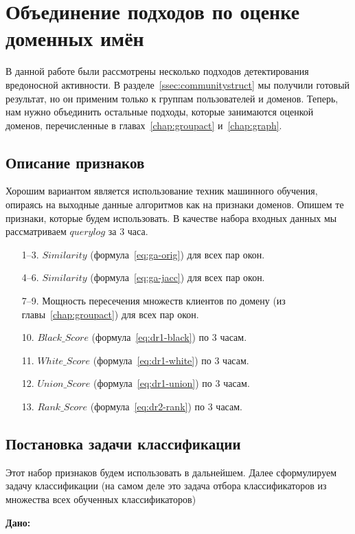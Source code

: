 \documentclass[a4paper,14pt]{extreport} %
\begin{document}
\chapter{Объединение подходов по оценке доменных имён}
\label{chap:union-all}
В данной работе были рассмотрены несколько подходов детектирования вредоносной активности. В разделе~\ref{ssec:communitystruct} мы получили готовый результат, но он применим только к группам пользователей и доменов. Теперь, нам нужно объединить остальные подходы, которые занимаются оценкой доменов, перечисленные в главах~\ref{chap:groupact} и~\ref{chap:graph}.
	
\section{Описание признаков}
\label{sec:desc-features}
Хорошим вариантом является использование техник машинного обучения, опираясь на выходные данные алгоритмов как на признаки доменов. Опишем те признаки, которые будем использовать. В качестве набора входных данных мы рассматриваем $querylog$ за 3 часа.
\begin{enumerate}
	\item [1--3.] $Similarity$ (формула~\eqref{eq:ga-orig}) для всех пар окон.
	\item [4--6.]$Similarity$ (формула~\eqref{eq:ga-jacc}) для всех пар окон.
	\item [7--9.] Мощность пересечения множеств клиентов по домену (из главы~\ref{chap:groupact}) для всех пар окон.
	\item [10.] $Black\_Score$ (формула~\eqref{eq:dr1-black}) по 3 часам.
	\item [11.] $White\_Score$ (формула~\eqref{eq:dr1-white}) по 3 часам.
	\item [12.] $Union\_Score$ (формула~\eqref{eq:dr1-union}) по 3 часам.
	\item [13.] $Rank\_Score$ (формула~\eqref{eq:dr2-rank}) по 3 часам.
	      	      		
\end{enumerate}
\section{Постановка задачи классификации}
Этот набор признаков будем использовать в дальнейшем. Далее сформулируем задачу классификации (на самом деле это задача отбора классификаторов из множества всех обученных классификаторов)
	
{\bf
	Дано:
}
\end{document}
